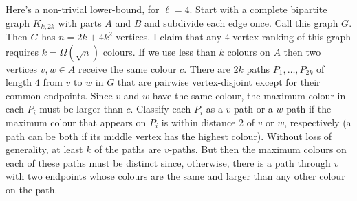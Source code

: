 \documentclass{patmorin}
\newcommand{\rn}[1]{\chi_{\operatorname{#1-vr}}}
\newcommand{\lrn}{\rn{\ell}}
\begin{document}
%




Here's a non-trivial lower-bound, for $\ell=4$.  Start with a complete bipartite graph $K_{k,2k}$ with parts $A$ and $B$ and subdivide each edge once.  Call this graph $G$.  Then $G$ has $n=2k+4k^2$ vertices.  I claim that any $4$-vertex-ranking of this graph requires $k=\Omega(\sqrt{n})$ colours.  If we use less than $k$ colours on $A$ then two vertices $v,w\in A$ receive the same colour $c$.  There are $2k$ paths $P_1,\ldots,P_{2k}$ of length $4$ from $v$ to $w$ in $G$ that are pairwise vertex-disjoint except for their common endpoints.  Since $v$ and $w$ have the same colour, the maximum colour in each $P_i$ must be larger than $c$.  Classify each $P_i$ as a $v$-path or a $w$-path if the maximum colour that appears on $P_i$ is within distance $2$ of $v$ or $w$, respectively (a path can be both if its middle vertex has the highest colour).  Without loss of generality, at least $k$ of the paths are $v$-paths.  But then the maximum colours on each of these paths must be distinct since, otherwise, there is a path through $v$ with two endpoints whose colours are the same and larger than any other colour on the path.
\end{document}
